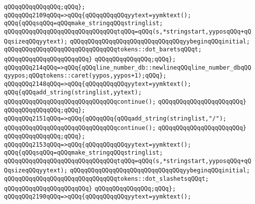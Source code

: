 \verb|qQQqqQQqqQQqqQQq;qQQq};|\newline
\verb|qQQqqQQq2109qQQq=>qQQq{qQQqqQQqqQQqyytext=yymktext();|\newline
\verb|qQQq{qQQqsqQQq=qQQqmake_stringqQQqstringlist;|\newline
\verb|qQQqqQQqqQQqqQQqqQQqqQQqqQQqqQQqtqQQq=qQQq(s,*stringstart,yyposqQQq+qQQqsizeqQQqyytext);|\newline
\verb|qQQqqQQqqQQqqQQqqQQqqQQqqQQqqQQqyybeginqQQqinitial;|\newline
\verb|qQQqqQQqqQQqqQQqqQQqqQQqqQQqqQQqtokens::dot_baretsqQQqt;|\newline
\verb|qQQqqQQqqQQqqQQqqQQqqQQq}|\newline
\verb|qQQqqQQqqQQqqQQq;qQQq};|\newline
\verb|qQQqqQQq214qQQq=>qQQq{qQQqline_number_db::newlineqQQqline_number_dbqQQqyypos;qQQqtokens::caret(yypos,yypos+1);qQQq};|\newline
\verb|qQQqqQQq2148qQQq=>qQQq{qQQqqQQqqQQqyytext=yymktext();|\newline
\verb|qQQq{qQQqadd_string(stringlist,yytext);|\newline
\verb|qQQqqQQqqQQqqQQqqQQqqQQqqQQqqQQqcontinue();|\newline
\verb|qQQqqQQqqQQqqQQqqQQqqQQq}|\newline
\verb|qQQqqQQqqQQqqQQq;qQQq};|\newline
\verb|qQQqqQQq2151qQQq=>qQQq{qQQqqQQq{qQQqadd_string(stringlist,"/");|\newline
\verb|qQQqqQQqqQQqqQQqqQQqqQQqqQQqqQQqcontinue();|\newline
\verb|qQQqqQQqqQQqqQQqqQQqqQQq}|\newline
\verb|qQQqqQQqqQQqqQQq;qQQq};|\newline
\verb|qQQqqQQq2153qQQq=>qQQq{qQQqqQQqqQQqyytext=yymktext();|\newline
\verb|qQQq{qQQqsqQQq=qQQqmake_stringqQQqstringlist;|\newline
\verb|qQQqqQQqqQQqqQQqqQQqqQQqqQQqqQQqtqQQq=qQQq(s,*stringstart,yyposqQQq+qQQqsizeqQQqyytext);|\newline
\verb|qQQqqQQqqQQqqQQqqQQqqQQqqQQqqQQqyybeginqQQqinitial;|\newline
\verb|qQQqqQQqqQQqqQQqqQQqqQQqqQQqqQQqtokens::dot_slashetsqQQqt;|\newline
\verb|qQQqqQQqqQQqqQQqqQQqqQQq}|\newline
\verb|qQQqqQQqqQQqqQQq;qQQq};|\newline
\verb|qQQqqQQq2190qQQq=>qQQq{qQQqqQQqqQQqyytext=yymktext();|\newline
